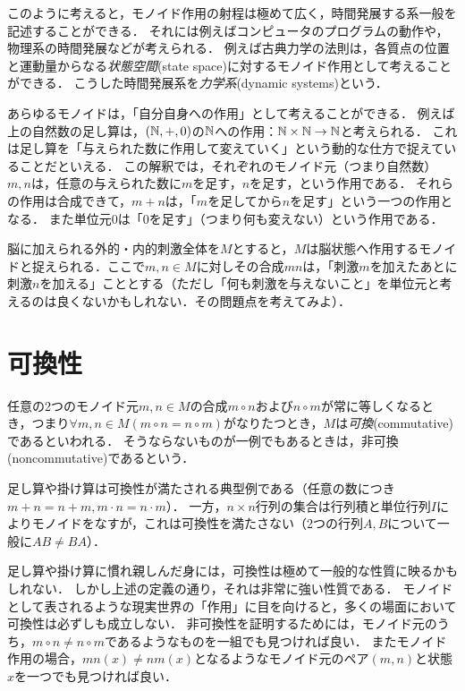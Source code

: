 \documentclass[11pt,a4paper,uplatex]{jsarticle}
\begin{document}
このように考えると，モノイド作用の射程は極めて広く，時間発展する系一般を記述することができる．
それには例えばコンピュータのプログラムの動作や，物理系の時間発展などが考えられる．
例えば古典力学の法則は，各質点の位置と運動量からなる\emph{状態空間}(state space)に対するモノイド作用として考えることができる．
こうした時間発展系を\emph{力学系}(dynamic systems)という．


\begin{example}
あらゆるモノイドは，「自分自身への作用」として考えることができる．
例えば上の自然数の足し算は，$(\mathbb{N}, +, 0)$の$\mathbb{N}$への作用：$\mathbb{N} \times \mathbb{N} \to \mathbb{N}$と考えられる．
これは足し算を「与えられた数に作用して変えていく」という動的な仕方で捉えていることだといえる．
この解釈では，それぞれのモノイド元（つまり自然数）$m, n$は，任意の与えられた数に$m$を足す，$n$を足す，という作用である．
それらの作用は合成できて，$m+n$は，「$m$を足してから$n$を足す」という一つの作用となる．
また単位元$0$は「$0$を足す」（つまり何も変えない）という作用である．
\end{example}


\begin{example}
    脳に加えられる外的・内的刺激全体を$M$とすると，$M$は脳状態へ作用するモノイドと捉えられる．ここで$m, n \in M$に対しその合成$mn$は，「刺激$m$を加えたあとに刺激$n$を加える」こととする（ただし「何も刺激を与えないこと」を単位元と考えるのは良くないかもしれない．その問題点を考えてみよ）．
\end{example}


\section{可換性}
任意の2つのモノイド元$m,n \in M$の合成$m \circ n$および$n \circ m$が常に等しくなるとき，つまり$\forall m,n \in M (m \circ n = n \circ m)$がなりたつとき，$M$は\emph{可換}(commutative)であるといわれる．
そうならないものが一例でもあるときは，非可換(noncommutative)であるという．

\begin{example}
    足し算や掛け算は可換性が満たされる典型例である（任意の数につき$m+n = n+m, m\cdot n = n\cdot m$）．
    一方，$n \times n$行列の集合は行列積と単位行列$I$によりモノイドをなすが，これは可換性を満たさない（2つの行列$A, B$について一般に$AB \neq BA$）．
\end{example}


足し算や掛け算に慣れ親しんだ身には，可換性は極めて一般的な性質に映るかもしれない．
しかし上述の定義の通り，それは非常に強い性質である．
モノイドとして表されるような現実世界の「作用」に目を向けると，多くの場面において可換性は必ずしも成立しない．
非可換性を証明するためには，モノイド元のうち，$m \circ n \neq n \circ m$であるようなものを一組でも見つければ良い．
またモノイド作用の場合，$mn(x) \neq nm(x)$となるようなモノイド元のペア$(m,n)$と状態$x$を一つでも見つければ良い．
\end{document}

